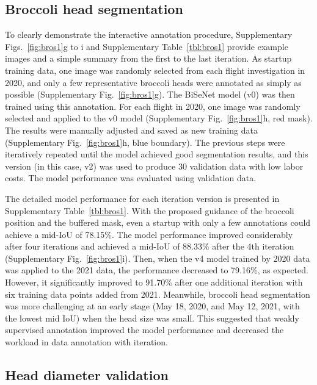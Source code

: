 \subsection{Broccoli head segmentation}

To clearly demonstrate the interactive annotation procedure, Supplementary \linebreak Figs.~\ref{fig:bros1}g to i and Supplementary Table~\ref{tbl:bros1} provide example images and a simple summary from the first to the last iteration. As startup training data, one image was randomly selected from each flight investigation in 2020, and only a few representative broccoli heads were annotated as simply as possible (Supplementary Fig.~\ref{fig:bros1}g). The BiSeNet model (v0) was then trained using this annotation. For each flight in 2020, one image was randomly selected and applied to the v0 model (Supplementary Fig.~\ref{fig:bros1}h, red mask). The results were manually adjusted and saved as new training data (Supplementary Fig.~\ref{fig:bros1}h, blue boundary). The previous steps were iteratively repeated until the model achieved good segmentation results, and this version (in this case, v2) was used to produce 30 validation data with low labor costs. The model performance was evaluated using validation data.

The detailed model performance for each iteration version is presented in Supplementary Table~\ref{tbl:bros1}. With the proposed guidance of the broccoli position and the buffered mask, even a startup with only a few annotations could achieve a mid-IoU of 78.15\%. The model performance improved considerably after four iterations and achieved a mid-IoU of 88.33\% after the 4th iteration (Supplementary Fig.~\ref{fig:bros1}i). Then, when the v4 model trained by 2020 data was applied to the 2021 data, the performance decreased to 79.16\%, as expected. However, it significantly improved to 91.70\% after one additional iteration with six training data points added from 2021. Meanwhile, broccoli head segmentation was more challenging at an early stage (May 18, 2020, and May 12, 2021, with the lowest mid IoU) when the head size was small. This suggested that weakly supervised annotation improved the model performance and decreased the workload in data annotation with iteration.

\subsection{Head diameter validation}

